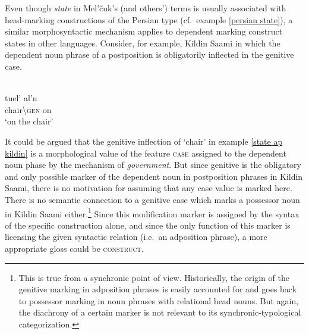 Even though \emph{state} in Mel'čuk's (and others') terms is usually associated with head-marking constructions of the Persian type (cf.~example \ref{persian state}), a similar morphosyntactic mechanism applies to dependent marking construct states in other languages. Consider, for example, Kildin Saami in which the dependent noun phrase of a postposition is obligatorily inflected in the genitive case.
\begin{exe}
\ex\label{state ap kildin} 
\\
\gll 	tuel'		al'n\\
	chair\textbackslash\textsc{gen}	on\\
\glt 	‘on the chair’
\end{exe}
It could be argued that the genitive inflection of ‘chair’ in example \ref{state ap kildin} is a morphological value of the feature \textsc{case} assigned to the dependent noun phase by the mechanism of \emph{government}. But since genitive is the obligatory and only possible marker of the dependent noun in postposition phrases in Kildin Saami, there is no motivation for assuming that any case value is marked here. There is no semantic connection to a genitive case which marks a possessor noun in Kildin Saami either.\footnote{This is true from a synchronic point of view. Historically, the origin of the genitive marking in adposition phrases is easily accounted for and goes back to possessor marking in noun phrases with relational head nouns. But again, the diachrony of a certain marker is not relevant to its synchronic-typological categorization.} Since this modification marker is assigned by the syntax of the specific construction alone, and since the only function of this marker is licensing the given syntactic relation (i.e.~an adposition phrase), a more appropriate gloss could be \textsc{construct}.

